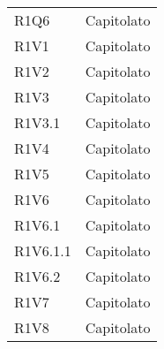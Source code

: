 \begin{longtable}{|C{6.5cm}|C{6.5cm}|}
	R1Q6 & Capitolato \\

	R1V1 & Capitolato \\

	R1V2 & Capitolato \\

	R1V3 & Capitolato \\

	R1V3.1 & Capitolato \\

	R1V4 & Capitolato \\

	R1V5 & Capitolato \\

	R1V6 & Capitolato \\

	R1V6.1 & Capitolato \\

	R1V6.1.1 & Capitolato \\

	R1V6.2 & Capitolato \\

	R1V7 & Capitolato \\
	R1V8 & Capitolato \\

	\hline

\end{longtable}
